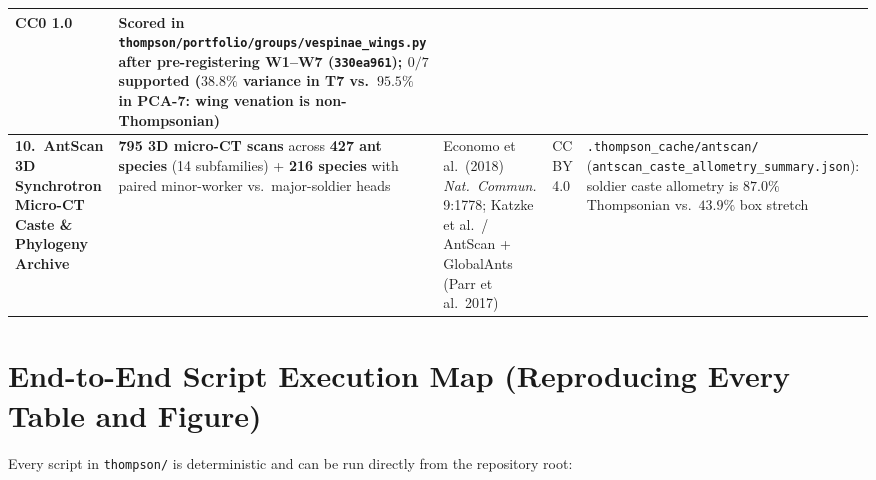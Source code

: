 \documentclass[10.5pt,a4paper]{article}
\newcommand{\code}[1]{{\footnotesize\nolinkurl{#1}}}
\begin{document}
{\begin{tabularx}{\textwidth}{L{1.28in} L{1.25in} L{1.35in} L{0.58in} Y}
CC0 1.0 &
Scored in \code{thompson/portfolio/groups/vespinae_wings.py} after pre-registering W1--W7 (\texttt{330ea961}); $0/7$ supported ($38.8\%$ variance in T7 vs.\ $95.5\%$ in PCA-7: wing venation is non-Thompsonian) \\
\midrule
\textbf{10.\ AntScan 3D Synchrotron Micro-CT Caste \& Phylogeny Archive} &
\textbf{795 3D micro-CT scans} across \textbf{427 ant species} (14 subfamilies) + \textbf{216 species} with paired minor-worker vs.\ major-soldier heads &
Economo et al.\ (2018) \emph{Nat.\ Commun.} 9:1778; Katzke et al.\ / AntScan + GlobalAnts (Parr et al.\ 2017) &
CC BY 4.0 &
\code{.thompson_cache/antscan/} (\code{antscan_caste_allometry_summary.json}): soldier caste allometry is $87.0\%$ Thompsonian vs.\ $43.9\%$ box stretch \\
\bottomrule
\end{tabularx}
}

\section{End-to-End Script Execution Map (Reproducing Every Table and Figure)}

Every script in \code{thompson/} is deterministic and can be run directly from the repository root:
\end{document}
